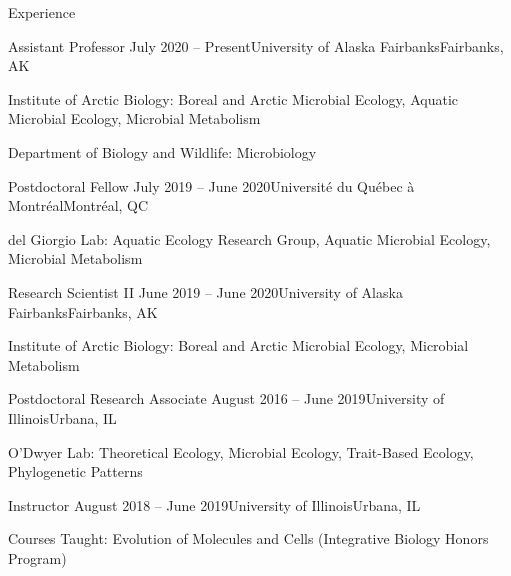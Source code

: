 \documentclass{resume} %
\begin{document}
\begin{rSection}{Experience}

    \begin{rSubsection}{Assistant Professor}
      {July 2020 -- Present}{University of Alaska Fairbanks}{Fairbanks, AK}
      \item Institute of Arctic Biology: Boreal and Arctic Microbial Ecology, Aquatic Microbial Ecology, Microbial Metabolism
      \item Department of Biology and Wildlife: Microbiology
    \end{rSubsection}  

    \begin{rSubsection}{Postdoctoral Fellow}
      {July 2019 -- June 2020}{Universit\'{e} du Qu\'{e}bec \`{a} Montr\'{e}al}{Montr\'{e}al, QC}
      \item del Giorgio Lab: Aquatic Ecology Research Group, Aquatic Microbial Ecology, Microbial Metabolism
    \end{rSubsection}
    
    \begin{rSubsection}{Research Scientist II}
      {June 2019 -- June 2020}{University of Alaska Fairbanks}{Fairbanks, AK}
      \item Institute of Arctic Biology: Boreal and Arctic Microbial Ecology, Microbial Metabolism
    \end{rSubsection}  
  
    \begin{rSubsection}{Postdoctoral Research Associate}
      {August 2016 -- June 2019}{University of Illinois}{Urbana, IL}
      \item O'Dwyer Lab: Theoretical Ecology, Microbial Ecology, Trait-Based Ecology, Phylogenetic Patterns
    \end{rSubsection}

    \begin{rSubsection}{Instructor}
      {August 2018 -- June 2019}{University of Illinois}{Urbana, IL}
      \item Courses Taught: Evolution of Molecules and Cells (Integrative Biology Honors Program)
    \end{rSubsection}


\end{rSection}
\end{document}
